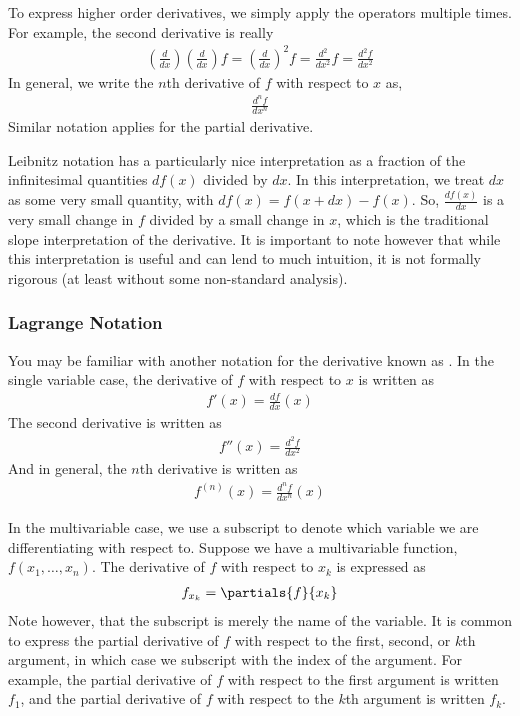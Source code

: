 To express higher order derivatives, we simply apply the operators multiple times. For example, the second derivative is really
\begin{align*}
    \left(\frac{d}{dx}\right)\left(\frac{d}{dx}\right) f = \left(\frac{d}{dx}\right)^2 f = \frac{d^2}{dx^2}f = \frac{d^2 f}{dx^2}
\end{align*}
In general, we write the $n$th derivative of $f$ with respect to $x$ as,
\begin{align*}
    \frac{d^n f}{dx^n}
\end{align*}
Similar notation applies for the partial derivative.

Leibnitz notation has a particularly nice interpretation as a fraction of the infinitesimal quantities $df(x)$ divided by $dx$. In this interpretation, we treat $dx$ as some very small quantity, with $df(x) = f(x + dx) - f(x)$. So, $\frac{df(x)}{dx}$ is a very small change in $f$ divided by a small change in $x$, which is the traditional slope interpretation of the derivative. It is important to note however that while this interpretation is useful and can lend to much intuition, it is not formally rigorous (at least without some non-standard analysis). 

\subsubsection*{Lagrange Notation}
You may be familiar with another notation for the derivative known as . In the single variable case, the derivative of $f$ with respect to $x$ is written as
\begin{align*}
    f'(x) = \frac{df}{dx}(x)
\end{align*}
The second derivative is written as
\begin{align*}
    f''(x) = \frac{d^2f}{dx^2}
\end{align*}
And in general, the $n$th derivative is written as
\begin{align*}
    f^{(n)}(x) = \frac{d^nf}{dx^n}(x)
\end{align*}

In the multivariable case, we use a subscript to denote which variable we are differentiating with respect to. Suppose we have a multivariable function, $f(x_1, \dots, x_n)$. The derivative of $f$ with respect to $x_k$ is expressed as
\begin{align*}
    f_{x_k} = \partials{f}{x_k}
\end{align*}
Note however, that the subscript is merely the name of the variable. It is common to express the partial derivative of $f$ with respect to the first, second, or $k$th argument, in which case we subscript with the index of the argument. For example, the partial derivative of $f$ with respect to the first argument is written $f_1$, and the partial derivative of $f$ with respect to the $k$th argument is written $f_k$. 

